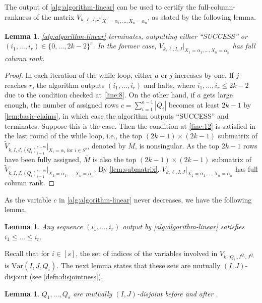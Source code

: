 \documentclass[11pt]{article}
\theoremstyle{plain}
\newtheorem{lemma}[thm]{Lemma}
\theoremstyle{definition}
\theoremstyle{remark}
\newcommand{\var}{\mathrm{Var}}
\begin{document}
The output of \cref{alg:algorithm-linear} can be used to certify the full-column-rankness of the matrix $V_{k,\ell,I,J}|_{X_1=\alpha_1,\dots,X_n=\alpha_n}$, as stated by the following lemma.

\begin{lemma}\label{lem:terminate} 
\cref{alg:algorithm-linear} terminates, outputting either ``SUCCESS'' or $(i_1,\dots,i_r)\in\{0,\dots,2k-2\}^r$. In the former case, $V_{k,\ell,I,J}|_{X_1=\alpha_1,\dots,X_n=\alpha_n}$ has full column rank. 
\end{lemma}

\begin{proof}
In each iteration of the while loop, either $a$ or $j$ increases by one. If $j$ reaches $r$, the algorithm outputs $(i_1,\dots,i_r)$ and halts, where $i_1,\dots,i_r\leq 2k-2$ due to the condition checked at \cref{line:8}.
On the other hand, if $a$ gets large enough, the number of assigned rows $c=\sum_{i=1}^{a-1} |Q_i|$ becomes at least $2k-1$ by \cref{lem:basic-claims}, in which case the algorithm outputs ``SUCCESS'' and terminates. 
Suppose this is the case. Then the condition at \cref{line:12} is satisfied in the last round of the while loop, i.e., the top $(2k-1)\times (2k-1)$ submatrix of $\widetilde{V}_{k,I,J,(Q_i)_{i=1}^{s-m}}|_{X_i=\alpha_i \text{ for } i\in S'}$, denoted by $\overline{M}$, is nonsingular.
As the top $2k-1$ rows have been fully assigned, $\overline{M}$ is also the top $(2k-1)\times (2k-1)$ submatrix of
$\widetilde{V}_{k,I,J,(Q_i)_{i=1}^{s-m}}|_{X_1=\alpha_1,\dots,X_n=\alpha_n}$.
By \cref{lem:submatrix}, $V_{k,\ell,I,J}|_{X_1=\alpha_1,\dots,X_n=\alpha_n}$ has full column rank.
\end{proof}

As the variable $c$ in \cref{alg:algorithm-linear} never decreases, we have the following lemma.

\begin{lemma}\label{lem:output}
Any sequence $(i_1,\dots,i_r)$ output by \cref{alg:algorithm-linear} satisfies $i_1\leq \dots\leq i_r$.
\end{lemma}

Recall that for $i\in [s]$, the set of indices of the variables involved in $V_{k,|Q_i|,I^{Q_i},J^{Q_i}}$ is $\var(I,J,Q_i)$.
The next lemma states that these sets are mutually $(I,J)$-disjoint (see \cref{defn:disjointness}).

\begin{lemma}\label{lem:disjoint}
$Q_1,\dots,Q_s$ are mutually $(I,J)$-disjoint before and after .
\end{lemma}
\end{document}
